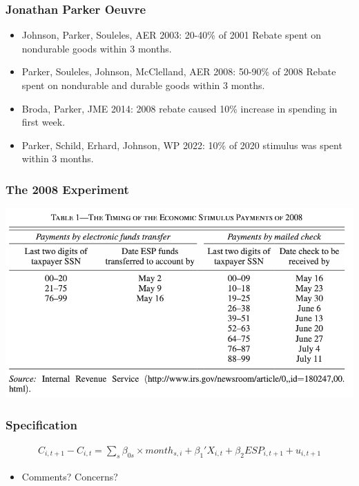 \documentclass[english,xcolor=svgnames]{beamer}
\begin{document}
\begin{frame}
\frametitle[alignment=center]{Jonathan Parker Oeuvre}
\begin{itemize}
	\item Johnson, Parker, Souleles, AER 2003: 20-40\% of 2001 Rebate spent on nondurable goods within 3 months.
	\item Parker, Souleles, Johnson, McClelland, AER 2008: 50-90\% of 2008 Rebate spent on nondurable and durable goods within 3 months.
	\item Broda, Parker, JME 2014: 2008 rebate caused 10\% increase in spending in first week.
	\item Parker, Schild, Erhard, Johnson, WP 2022: 10\% of 2020 stimulus was spent within 3 months.
\end{itemize}
\end{frame}

\begin{frame}
\frametitle[alignment=center]{The 2008 Experiment}
\centering
\includegraphics[scale=0.6]{figures/PSMJTAB1.png}
\end{frame}

\begin{frame}
\frametitle[alignment=center]{Specification}
\begin{align*}
	C_{i,t+1}-C_{i,t} = \sum_s \beta_{0s} \times month_{s,i} + \beta_1'X_{i,t} + \beta_2 ESP_{i,t+1} + u_{i,t+1}
\end{align*}
\begin{itemize}
	\item Comments? Concerns?
\end{itemize}
\end{frame}
\end{document}
